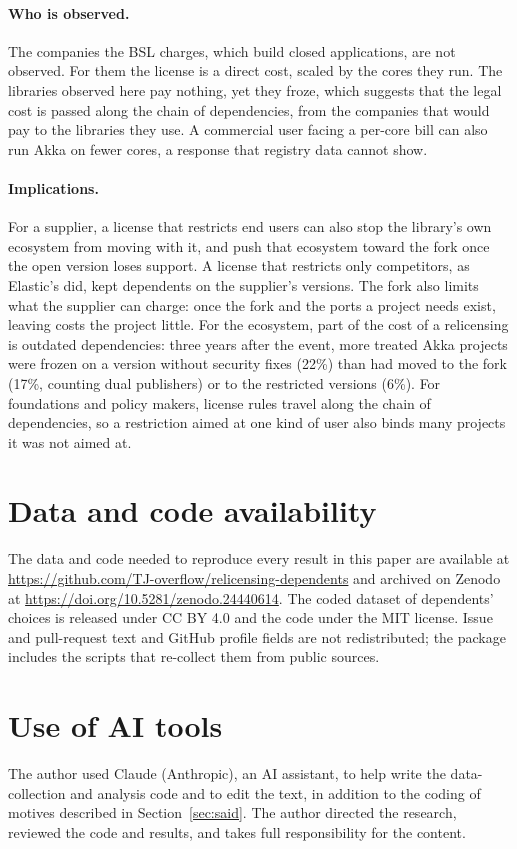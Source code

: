 \documentclass[11pt]{article}
\begin{document}
\paragraph{Who is observed.} The companies the BSL charges, which build closed applications, are not observed. For them the license is a direct cost, scaled by the cores they run. The libraries observed here pay nothing, yet they froze, which suggests that the legal cost is passed along the chain of dependencies, from the companies that would pay to the libraries they use. A commercial user facing a per-core bill can also run Akka on fewer cores, a response that registry data cannot show.

\paragraph{Implications.} For a supplier, a license that restricts end users can also stop the library's own ecosystem from moving with it, and push that ecosystem toward the fork once the open version loses support. A license that restricts only competitors, as Elastic's did, kept dependents on the supplier's versions. The fork also limits what the supplier can charge: once the fork and the ports a project needs exist, leaving costs the project little. For the ecosystem, part of the cost of a relicensing is outdated dependencies: three years after the event, more treated Akka projects were frozen on a version without security fixes (22\%) than had moved to the fork (17\%, counting dual publishers) or to the restricted versions (6\%). For foundations and policy makers, license rules travel along the chain of dependencies, so a restriction aimed at one kind of user also binds many projects it was not aimed at.

\section*{Data and code availability}
The data and code needed to reproduce every result in this paper are available at \url{https://github.com/TJ-overflow/relicensing-dependents} and archived on Zenodo at \url{https://doi.org/10.5281/zenodo.24440614}. The coded dataset of dependents' choices is released under CC BY 4.0 and the code under the MIT license. Issue and pull-request text and GitHub profile fields are not redistributed; the package includes the scripts that re-collect them from public sources.

\section*{Use of AI tools}
The author used Claude (Anthropic), an AI assistant, to help write the data-collection and analysis code and to edit the text, in addition to the coding of motives described in Section~\ref{sec:said}. The author directed the research, reviewed the code and results, and takes full responsibility for the content.



\end{document}
